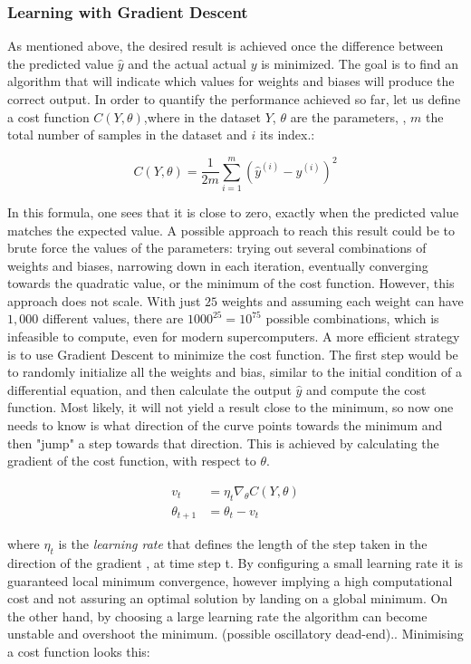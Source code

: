 \subsubsection{Learning with Gradient Descent}

As mentioned above, the desired result is achieved once the difference between the predicted value $\hat{y}$ and the actual actual $y$ is minimized. The goal is to find an algorithm that will indicate which values for weights and biases will produce the correct output. In order to quantify the performance achieved so far, let us define a cost function $C(Y,\theta)$,where in the  dataset $Y$, $\theta$ are the parameters, , $m$ the total number of samples in the dataset and $i$ its index.:

\begin{equation}
 	C(Y,\theta) = \frac{1}{2m}\sum_{i=1}^{m}(\hat{y}^{(i)} - y^{(i)})^2
\end{equation}

In this formula, one sees that it is close to zero, exactly when the predicted value matches the expected value. A possible approach to reach this result could be to brute force the values of the parameters: trying out several combinations of weights and biases, narrowing down in each iteration, eventually converging towards the quadratic value, or the minimum of the cost function. However, this approach does not scale. With just $25$ weights and assuming each weight can have $1,000$ different values, there are $1000^{25} =10^{75}$ possible combinations, which is infeasible to compute, even for modern supercomputers\cite{ml_phys}.
A more efficient strategy is to use Gradient Descent to minimize the cost function. The first step would be to randomly initialize all the weights and bias, similar to the initial condition of a differential equation, and then calculate the output $\hat{y}$ and compute the cost function. Most likely, it will not yield a result close to the minimum, so now one needs to know is what direction of the curve points towards the minimum and then "jump" a step towards that direction. This is achieved by calculating the gradient of the cost function, with respect to $\theta$.

\begin{align}
	v_t &= \eta_t \nabla_{\theta} C(Y,\theta) \\
	\theta_{t+1} &= 	\theta_{t}  - v_t
\end{align}

where  $\eta_t$ is the \textit{learning rate} that defines the length of the step taken in the direction of the gradient , at time step t. By configuring a small learning rate it is guaranteed local minimum convergence, however implying a high computational cost and not assuring an optimal solution by landing on a global minimum. On the other hand, by choosing a large learning rate the algorithm can become unstable and overshoot the minimum. (possible oscillatory dead-end).\cite{ml_phys}.  Minimising a cost function looks this:

